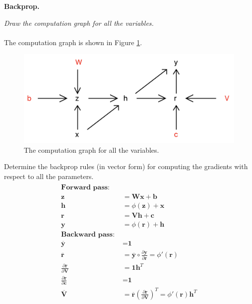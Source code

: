 \documentclass{myhw}
\begin{document}
\begin{homeworkProblem}
\textbf{Backprop.}
\begin{homeworkSection}
\emph{Draw the computation graph for all the variables.} \\
\\
The computation graph is shown in Figure \ref{fig:q2.1}.
\begin{figure}[h]
  \centering
  \includegraphics[width=.5\textwidth]{q2.1.png} 
  \caption{The computation graph for all the variables. }
  \label{fig:q2.1}
\end{figure}
\end{homeworkSection}
\begin{homeworkSection}
Determine the backprop rules (in vector form) for computing the gradients with respect to all the parameters. \\
\begin{gather*}
\begin{aligned}
\textbf{Forward pass: \ \ \ \ } \\
\textbf{z} &= \textbf{Wx} + \textbf{b} \\
\textbf{h} &= \phi(\textbf{z}) + \textbf{x} \\
\textbf{r} &= \textbf{Vh} + \textbf{c} \\
\textbf{y} &= \phi(\textbf{r}) + \textbf{h} \\
\textbf{Backward pass: \ \ \ \ } \\
\overline{\textbf{y}} &= \textbf{1} \\
\overline{\textbf{r}} &= \overline{\textbf{y}} \circ \frac{\partial\textbf{y}}{\partial\textbf{r}} = \phi'(\textbf{r}) \\
\frac{\partial{\textbf{r}}}{\partial{\textbf{V}}} &= \textbf{1}\textbf{h}^T \\
\frac{\partial{\textbf{r}}}{\partial{\textbf{c}}} &= \textbf{1} \\
\overline{\textbf{V}} &= \overline{\textbf{r}} (\frac{\partial{\textbf{r}}}{\partial{\textbf{V}}})^T = \phi'(\textbf{r}) \textbf{h}^T \\

\end{aligned}
\end{gather*}
\end{homeworkSection}
\end{homeworkProblem}
\end{document}
